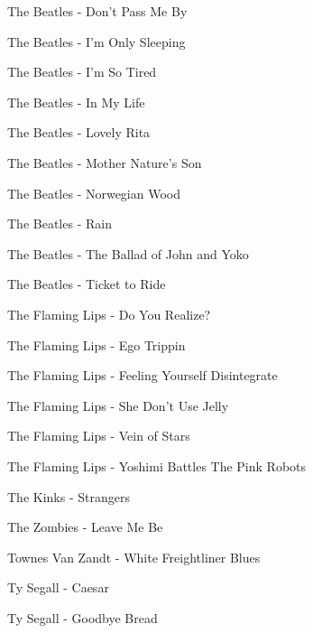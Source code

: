 The Beatles - Don't Pass Me By \dotfill \pageref{Don't Pass Me By - The Beatles} 

The Beatles - I'm Only Sleeping \dotfill \pageref{I'm Only Sleeping - The Beatles} 

The Beatles - I'm So Tired \dotfill \pageref{I'm So Tired - The Beatles} 

The Beatles - In My Life \dotfill \pageref{In My Life - The Beatles} 

The Beatles - Lovely Rita \dotfill \pageref{Lovely Rita - The Beatles} 

The Beatles - Mother Nature's Son \dotfill \pageref{Mother Nature's Son - The Beatles} 

The Beatles - Norwegian Wood \dotfill \pageref{Norwegian Wood - The Beatles} 

The Beatles - Rain \dotfill \pageref{Rain - The Beatles} 

The Beatles - The Ballad of John and Yoko \dotfill \pageref{The Ballad of John and Yoko - The Beatles} 

The Beatles - Ticket to Ride \dotfill \pageref{Ticket to Ride - The Beatles} 

The Flaming Lips - Do You Realize? \dotfill \pageref{Do You Realize? - The Flaming Lips} 

The Flaming Lips - Ego Trippin \dotfill \pageref{Ego Trippin - The Flaming Lips} 

The Flaming Lips - Feeling Yourself Disintegrate \dotfill \pageref{Feeling Yourself Disintegrate - The Flaming Lips} 

The Flaming Lips - She Don't Use Jelly \dotfill \pageref{She Don't Use Jelly - The Flaming Lips} 

The Flaming Lips - Vein of Stars \dotfill \pageref{Vein of Stars - The Flaming Lips} 

The Flaming Lips - Yoshimi Battles The Pink Robots \dotfill \pageref{Yoshimi Battles The Pink Robots - The Flaming Lips} 

The Kinks - Strangers \dotfill \pageref{Strangers - The Kinks} 

The Zombies - Leave Me Be \dotfill \pageref{Leave Me Be - The Zombies} 

Townes Van Zandt - White Freightliner Blues \dotfill \pageref{White Freightliner Blues - Townes Van Zandt} 

Ty Segall - Caesar \dotfill \pageref{Caesar - Ty Segall} 

Ty Segall - Goodbye Bread \dotfill \pageref{Goodbye Bread - Ty Segall} 

